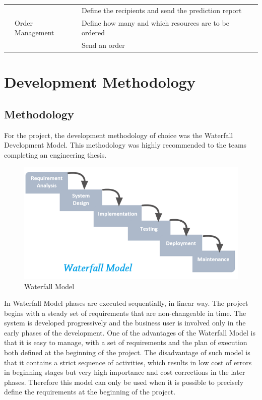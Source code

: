 \documentclass[a4paper,11pt,twoside]{report}
\theoremstyle{definition}
\begin{document}
\begin{longtable}{|p{3cm}|p{3cm}|p{10cm}|}
\texttt{} & & Define the recipients and send the prediction report \\ \cline{2-3}

\texttt{} & Order \mbox{Management} & Define how many and which resources are to be ordered\\ \cline{3-3}
\texttt{} & & Send an order\\ \hline

\end{longtable}





\chapter{Development Methodology}

\section{Methodology}

For the project, the development methodology of choice was the Waterfall Development Model. This methodology was highly recommended to the teams completing an engineering thesis.

\begin{figure}[h!]

\begin{center}

\includegraphics[width=\textwidth]{water}

\end{center}
\caption{Waterfall Model}
\end{figure}


In Waterfall Model phases are executed sequentially, in linear way. The project begins with a steady set of requirements that are non-changeable in time. The system is developed progressively and the business user is involved only in the early phases of the development. 
One of the advantages of the Waterfall Model is that it is easy to manage, with a set of requirements and the plan of execution both defined at the beginning of the project. The disadvantage of such model is that it contains a strict sequence of activities, which results in low cost of errors in beginning stages but very high importance and cost corrections in the later phases. Therefore this model can only be used when it is possible to precisely define the requirements at the beginning of the project.\cite{D}
 
\end{document}
